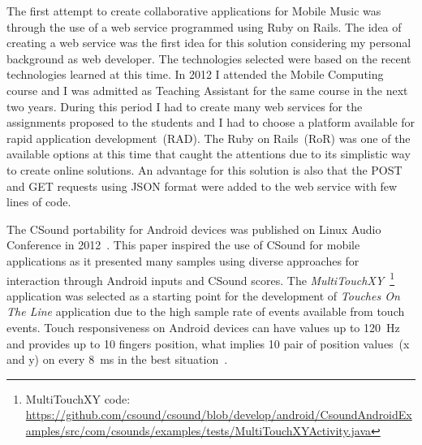 The first attempt to create collaborative applications for Mobile Music was through the use of a web service programmed using Ruby on Rails.
The idea of creating a web service was the first idea for this solution considering my personal background as web developer.
The technologies selected were based on the recent technologies learned at this time. %
In 2012 I attended the Mobile Computing course and I was admitted as Teaching Assistant for the same course in the next two years.
During this period I had to create many web services for the assignments proposed to the students and I had to choose a platform available for rapid application development~(RAD).
The Ruby on Rails~(RoR) was one of the available options at this time that caught the attentions due to its simplistic way to create online solutions. %
An advantage for this solution is also that the POST and GET requests using JSON format were added to the web service with few lines of code.

The CSound portability for Android devices was published on Linux Audio Conference in 2012~\citep{Yi2012csound}.
This paper inspired the use of CSound for mobile applications as it presented many samples using diverse approaches for interaction through Android inputs and CSound scores.
The \textit{MultiTouchXY}~\footnote{MultiTouchXY code: \url{https://github.com/csound/csound/blob/develop/android/CsoundAndroidExamples/src/com/csounds/examples/tests/MultiTouchXYActivity.java}} application was selected as a starting point for the development of \textit{Touches On The Line} application due to the high sample rate of events available from touch events.
Touch responsiveness on Android devices can have values up to 120~Hz and provides up to 10 fingers position, what implies 10 pair of position values~(x and y) on every 8~ms in the best situation~\cite{Padre2017touchresponsiveness}.

